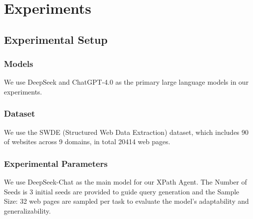 \documentclass[a4paper]{article}
\begin{document}
\section{Experiments }

\subsection{Experimental Setup}

\subsubsection{Models}
We use DeepSeek and ChatGPT-4.0 as the primary large language models in our experiments.

\subsubsection{Dataset}
We use the SWDE \cite{abdin2024phi3technicalreporthighly} (Structured Web Data Extraction) dataset, which includes 90 of websites across 9 domains, in total 20414 web pages.

\subsubsection{Experimental Parameters}
We use DeepSeek-Chat as the main model for our XPath Agent. The Number of Seeds is 3 initial seeds are provided to guide query generation and the 
Sample Size: 32 web pages are sampled per task to evaluate the model’s adaptability and generalizability.
\end{document}
